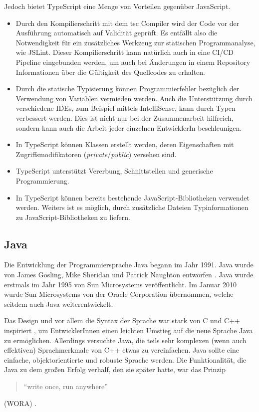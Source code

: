 Jedoch bietet TypeScript eine Menge von Vorteilen 
gegenüber JavaScript.
\begin{itemize}
  \item Durch den Kompilierschritt mit dem tsc Compiler wird der 
    Code vor der Ausführung automatisch auf Validität geprüft. 
    Es entfällt also die Notwendigkeit für ein zusätzliches Werkzeug 
    zur statischen Programmanalyse, wie JSLint. 
    Dieser Kompilierschritt kann natürlich auch in eine 
    CI/CD Pipeline eingebunden werden, um auch bei Änderungen in einem
    Repository Informationen über die Gültigkeit des Quellcodes zu erhalten.
  \item Durch die statische Typisierung können Programmierfehler bezüglich
    der Verwendung von Variablen vermieden werden. Auch die Unterstützung 
    durch verschiedene IDEs, zum Beispiel mittels IntelliSense, kann durch 
    Typen verbessert werden. Dies ist nicht nur bei der Zusammenarbeit hilfreich, 
    sondern kann auch die Arbeit jeder einzelnen EntwicklerIn beschleunigen.
  \item In TypeScript können Klassen erstellt werden, deren Eigenschaften mit 
    Zugriffsmodifikatoren (\emph{private}/\emph{public}) versehen sind.
  \item TypeScript unterstützt Vererbung, Schnittstellen und generische Programmierung.
  \item In TypeScript können bereits bestehende JavaScript-Bibliotheken 
    verwendet werden. Weiters ist es möglich, durch zusätzliche Dateien 
    Typinformationen zu \linebreak
    JavaScript-Bibliotheken zu liefern.
\end{itemize}

\subsection{Java}

Die Entwicklung der Programmiersprache Java begann im Jahr 1991. Java 
wurde von James Gosling, Mike Sheridan und Patrick Naughton entworfen \cite{WinnieDoug2021EJfA}.
Java wurde erstmals im Jahr 1995 von Sun Microsystems veröffentlicht. 
Im Januar 2010 wurde Sun Microsystems von der Oracle Corporation übernommen, 
welche seitdem auch Java weiterentwickelt.

Das Design und vor allem die Syntax der Sprache war stark von C und C++ inspiriert \cite{ArnoldKen1996TJpl}, 
um EntwicklerInnen einen leichten Umstieg auf die neue Sprache Java zu ermöglichen. 
Allerdings versuchte Java, die teils sehr komplexen (wenn auch effektiven) 
Sprachmerkmale von C++ etwas zu vereinfachen. Java sollte eine einfache, objektorientierte 
und robuste Sprache werden. Die Funktionalität, die Java zu dem großen Erfolg verhalf, 
den sie später hatte, war das Prinzip
\begin{quote}\begin{english}\enquote{write once, run anywhere}\end{english}\end{quote}
(WORA) \cite{SharanKishori2022BJ1f}. 

